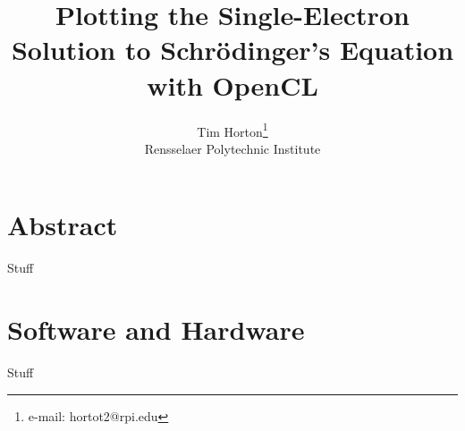 \documentclass{acmsiggraph}
\title{Plotting the Single-Electron Solution to Schr\"{o}dinger's Equation with OpenCL}
\author{Tim Horton\thanks{e-mail: hortot2@rpi.edu}\\Rensselaer Polytechnic Institute}
\begin{document}
\maketitle

\section{Abstract}

Stuff

\section{Software and Hardware}

Stuff

% 
% 
\end{document}
